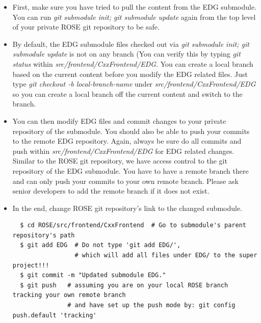 \begin{itemize}
\begin{itemize}
  \item First, make sure you have tried to pull the content from the EDG submodule. You can run \textit{git submodule init; git submodule update} again from the top level of your private ROSE git repository to be safe. 
  \item By default, the EDG submodule files checked out via \textit{git submodule init; git submodule update} is not on any branch (You can verify this by typing \textit{git status} within \textit{src/frontend/CxxFrontend/EDG}.  
You can create a local branch based on the current content before you modify the EDG related files. Just type \textit{git checkout -b local-branch-name} under \textit{src/frontend/CxxFrontend/EDG} so you can create a local branch off the current content and switch to the branch.
   \item You can then modify EDG files and commit changes to your private repository of the submodule. 
         You should also be able to push your commits to the remote EDG repository.
         Again, always be sure do all commits and push within \textit{src/frontend/CxxFrontend/EDG} for EDG related changes. 
         Similar to the ROSE git repository, we have access control to the git repository of the EDG submodule. You have to have a remote branch there 
         and can only push your commits to your own remote branch. Please ask senior developers to add the remote branch if it does
         not exist.   
   \item In the end, change ROSE git repository's link to the changed submodule. 
  \begin{verbatim}
  $ cd ROSE/src/frontend/CxxFrontend  # Go to submodule's parent repository's path 
  $ git add EDG  # Do not type 'git add EDG/', 
                 # which will add all files under EDG/ to the super project!!!
  $ git commit -m "Updated submodule EDG."
  $ git push   # assuming you are on your local ROSE branch tracking your own remote branch 
               # and have set up the push mode by: git config push.default 'tracking'
  \end{verbatim}  
   
   \end{itemize}


\end{itemize}
